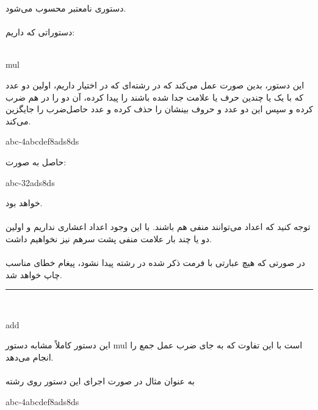 \documentclass[]{article}
\begin{document}
   دستوری نامعتبر محسوب می‌شود.
\\\\
دستوراتی که داریم:\\\\
\begin{tcolorbox}[boxrule=0pt]
	\begin{latin}
  	  \large{
  	  	mul
		}
	\end{latin}
\end{tcolorbox}
این دستور، بدین صورت عمل می‌کند که در رشته‌ای که در اختیار داریم، اولین دو عدد که با یک یا چندین حرف یا علامت جدا شده باشند را پیدا کرده، آن دو را در هم ضرب کرده و سپس این دو عدد و حروف بینشان را حذف کرده و عدد حاصل‌ضرب را جایگزین می‌کند.\\
\begin{tcolorbox}[boxrule=0pt]
	\begin{latin}
  	  \large{
  	  	abc-4abcdef8ads8ds
		}
	\end{latin}
\end{tcolorbox}
حاصل به صورت:\\
\begin{tcolorbox}[boxrule=0pt]
	\begin{latin}
  	  \large{
  	  	abc-32ads8ds
		}
	\end{latin}
\end{tcolorbox}
خواهد بود.\\\\
توجه کنید که اعداد می‌توانند منفی هم باشند. با این وجود اعداد اعشاری نداریم و اولین دو یا چند بار علامت منفی پشت سرهم نیز نخواهیم داشت.\\\\
در صورتی که هیچ عبارتی با فرمت ذکر شده در رشته پیدا نشود، پیغام خطای مناسب چاپ خواهد شد.\\
\noindent\rule[0.5ex]{\linewidth}{1pt}\\
\begin{tcolorbox}[boxrule=0pt]
	\begin{latin}
  	  \large{
  	  	add
		}
	\end{latin}
\end{tcolorbox}
این دستور کاملاً مشابه دستور mul است با این تفاوت که به جای ضرب عمل جمع را انجام می‌دهد.\\\\
به عنوان مثال در صورت اجرای این دستور روی رشته\\
\begin{tcolorbox}[boxrule=0pt]
	\begin{latin}
  	  \large{
  	  	abc-4abcdef8ads8ds
		}
	\end{latin}
\end{tcolorbox}
\end{document}
